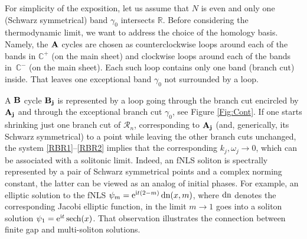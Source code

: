 \documentclass[pdftex]{sigma}
\numberwithin{equation}{section}
\def\ra{\rightarrow}
\renewcommand{\o}{\omega}
\newcommand{\g}{\gamma}
\def\Rscr{\mathcal{R}}
\newcommand{\sech}{\hbox{sech}}
\def\C{{\mathbb C}}
\def\R{{\mathbb R}}
\def\g{\gamma}
\def\dn{\mathop{\rm dn}\nolimits}
\def\sech{\mathop{\rm sech}\nolimits}
\def\o{\omega}
\def\g{\gamma}
\begin{document}
For simplicity of the exposition, let us assume that $N$ is even and only one (Schwarz symmetrical) band $\g_0$ intersects $\R$.
Before considering the thermodynamic limit, we want to address the choice of the homology basis. Namely, the $\bf A$ cycles are chosen as counterclockwise loops around each of the bands in $\C^+$ (on the main sheet) and clockwise loops around each of the bands in~$\C^-$ (on the main sheet). Each such loop contains only one band (branch cut) inside.
That leaves one exceptional band $\g_0$ not surrounded by a loop.

A $\bf B$ cycle $\bf B_j$ is represented by a loop going through the branch cut encircled by $\bf A_j$ and through
the exceptional branch cut $\g_0$,
see Figure \ref{Fig:Cont}.
If one starts shrinking just one branch cut of $\Rscr_n$, corresponding to $\bf A_j$ (and, generically, its Schwarz symmetrical) to a point while leaving the other branch cuts unchanged, the system \eqref{RBR1}--\eqref{RBR2} implies that the corresponding $k_j,\o_j\ra 0$, which can be associated with a solitonic limit. Indeed, an fNLS soliton is spectrally represented by a pair of Schwarz symmetrical points and a complex norming constant, the latter can be viewed as an analog of initial phases. For example, an elliptic solution to the fNLS $\psi_{m} = {\rm e}^{{\rm i}t(2-m)}\dn(x,m) $, where $\dn$ denotes the corresponding Jacobi elliptic function, in the limit $m\ra 1$ goes into a soliton solution $\psi_{1} = {\rm e}^{{\rm i}t}\sech(x) $. That observation illustrates the connection between finite gap and multi-soliton solutions.
\end{document}
